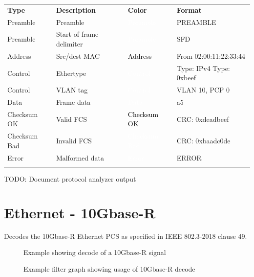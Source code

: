 \begin{tabularx}{16cm}{lllX}
\thickhline
\textbf{Type} & \textbf{Description} & \textbf{Color} & \textbf{Format} \\
\thickhline
Preamble & Preamble & \cellcolor{preamble}\textcolor{white}{Preamble} & PREAMBLE \\
\thinhline
Preamble & Start of frame delimiter & \cellcolor{preamble}\textcolor{white}{Preamble} & SFD \\
\thinhline
Address & Src/dest MAC & \cellcolor{address}\textcolor{black}{Address} & From 02:00:11:22:33:44 \\
\thinhline
Control & Ethertype & \cellcolor{control}\textcolor{white}{Control} & Type: IPv4 \newline Type: 0xbeef \\
\thinhline
Control & VLAN tag & \cellcolor{control}\textcolor{white}{Control} & VLAN 10, PCP 0 \\
\thinhline
Data & Frame data & \cellcolor{data}\textcolor{white}{Data} & a5 \\
\thinhline
Checksum OK & Valid FCS & \cellcolor{checksumok}\textcolor{black}{Checksum OK} & CRC: 0xdeadbeef \\
\thinhline
Checksum Bad & Invalid FCS & \cellcolor{checksumbad}\textcolor{white}{Checksum Bad} & CRC: 0xbaadc0de \\
\thinhline
Error & Malformed data & \cellcolor{error}\textcolor{white}{Error} & ERROR \\
\thickhline
\end{tabularx}

TODO: Document protocol analyzer output

\pagebreak
\section{Ethernet - 10Gbase-R}
\label{filter:10gbaser}

Decodes the 10Gbase-R Ethernet PCS as specified in IEEE 802.3-2018 clause 49.

\begin{figure}[h]
\centering
{}
\caption{Example showing decode of a 10Gbase-R signal}
\label{filter_10gbaser}
\end{figure}

\begin{figure}[h]
\centering
{}
\caption{Example filter graph showing usage of 10Gbase-R decode}
\label{filter_graph_10gbaser}
\end{figure}

